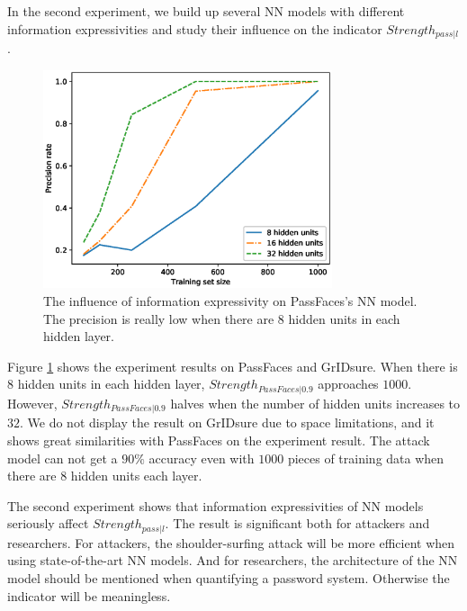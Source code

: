 \documentclass{article}
\begin{document}
  In the second experiment, we build up several NN models with different information expressivities and study 
  their influence on the indicator $Strength_{pass|l}$.
  \begin{figure}[htb]
    \centering
    \includegraphics[width=8.5cm]{passfaces.eps}
    \caption{The influence of information expressivity on PassFaces's NN model. The precision is really 
    low when there are $8$ hidden units in each hidden layer.}
    \label{fig:results2}
  \end{figure}
  
  Figure \ref{fig:results2} shows the experiment results on PassFaces and GrIDsure. When there is $8$ hidden 
  units in each hidden layer, $Strength_{PassFaces|0.9}$ approaches $1000$. However, $Strength_{PassFaces|0.9}$ halves 
  when the number of hidden units increases to $32$. We do not display the result on GrIDsure due to space 
  limitations, and it shows great similarities with PassFaces on the experiment result. The attack model can not 
  get a $90\%$ accuracy even with $1000$ pieces of training data when there are $8$ hidden units each layer.
  
  The second experiment shows that information expressivities of NN models seriously affect $Strength_{pass|l}$. 
  The result is significant both for attackers and researchers. For attackers, the shoulder-surfing attack will be 
  more efficient when using state-of-the-art NN models. And for researchers, the architecture of the NN model should 
  be mentioned when quantifying a password system. Otherwise the indicator will be meaningless.
  
\end{document}
